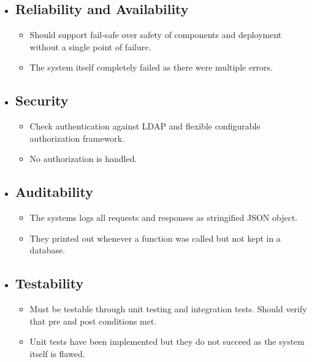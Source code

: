 \begin{itemize}
            \item \subsection{Reliability and Availability}
                \begin{itemize}
                    \item Should support fail-safe over safety of components and deployment without a single point of failure.
                    \item The system itself completely failed as there were multiple errors.
                \end{itemize}
                
            \item \subsection{Security}
                \begin{itemize}
                    \item Check authentication against LDAP and flexible configurable authorization framework.
                    \item No authorization is handled.
                \end{itemize}
                 \item \subsection{Auditability}
                \begin{itemize}
                    \item The systems logs all requests and responses as stringified JSON object.
                    \item They printed out whenever a function was called but not kept in a database.
                \end{itemize}
                
            \item \subsection{Testability}
                \begin{itemize}
                    \item Must be testable through unit testing and integration tests. Should verify that pre and post conditions met.
                    \item Unit tests have been implemented but they do not succeed as the system itself is flawed.
                \end{itemize}
            

\end{itemize}
